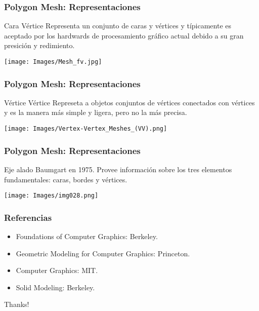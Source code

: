 \documentclass{beamer}
\begin{document}
\begin{frame}
\frametitle{Polygon Mesh: Representaciones}
\begin{block}{Cara V\' ertice}
Representa un conjunto de caras y v\' ertices y t\' ipicamente es aceptado por los hardwards de procesamiento gr\' afico actual debido a su gran presici\' on y redimiento.
\end{block}
\texttt{[image: Images/Mesh\_fv.jpg]} 
\end{frame}
\begin{frame}
\frametitle{Polygon Mesh: Representaciones}
\begin{block}{V\' ertice V\' ertice}
Represeta a objetos conjuntos de v\' ertices conectados con v\' ertices y es la manera m\' as simple y ligera, pero no la m\' as precisa.
\end{block}
\texttt{[image: Images/Vertex-Vertex\_Meshes\_(VV).png]} 
\end{frame}
\begin{frame}
\frametitle{Polygon Mesh: Representaciones}
\begin{block}{Eje alado}
Baumgart en 1975. Provee informaci\' on sobre los tres elementos fundamentales: caras, bordes y v\' ertices.
\end{block}
\texttt{[image: Images/img028.png]} 
\end{frame}











\begin{frame}
\frametitle{Referencias}
\begin{itemize}
\item Foundations of Computer Graphics: Berkeley.
\item Geometric Modeling for Computer Graphics: Princeton.
\item Computer Graphics: MIT.
\item Solid Modeling: Berkeley.
\end{itemize}
\begin{center}
{\Huge Thanks!}
\end{center}
\end{frame}
\end{document}
